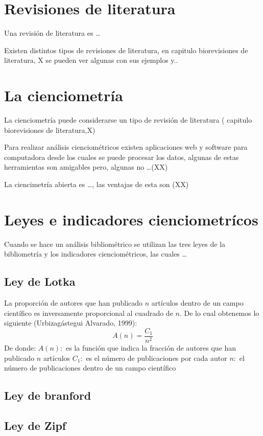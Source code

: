 \section{Revisiones de literatura}
\noindent
Una revisión de literatura es … 

\smallskip
Existen distintos tipos de revisiones de literatura, en   capitulo biorevisiones de literatura, X se pueden ver algunas con sus ejemplos y..

\section{La cienciometría}
\noindent
La cienciometría puede considerarse un tipo de revisión de literatura ( capitulo biorevisiones de literatura,X) 

 \smallskip
Para realizar análisis cienciométricos existen aplicaciones web y software para computadora desde los cuales se puede procesar los datos, algunas de estas herramientas son amigables pero, algunas no …(XX) 

\smallskip
La ciencimetría abierta es …, las ventajas de esta son (XX)  

\section{Leyes e indicadores cienciometrícos}
\noindent
Cuando se hace un análisis bibliométrico se utilizan las tres leyes de la bibliometría y los indicadores cienciométricos, las cuales …  

\subsection{Ley de Lotka}
\noindent
La proporción de autores que han publicado $n$ artículos dentro de un campo científico es inversamente proporcional al cuadrado de $n$. De lo cual obtenemos lo siguiente (Urbizagástegui Alvarado, 1999):
$$A(n)=\frac{C_1}{n^2}$$
De donde: 
$A(n):$ es la función que indica la fracción de autores que han publicado $n$ artículos 
$C_1:$ es el número de publicaciones por cada autor  
$n:$ el número de publicaciones dentro de un campo científico  
\subsection{Ley de branford }
\noindent
\subsection{Ley de Zipf}
\noindent

